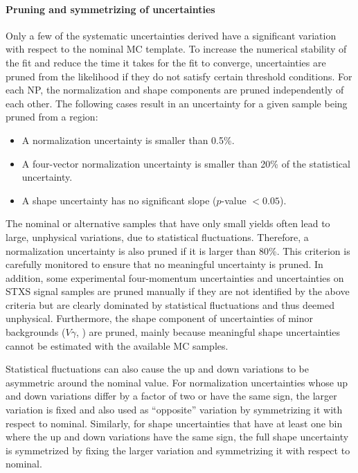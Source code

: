 \paragraph{Pruning and symmetrizing of uncertainties}
Only a few of the systematic uncertainties derived have a significant variation with respect to the nominal MC template. To increase the numerical stability of the fit and reduce the time it takes for the fit to converge, uncertainties are pruned from the likelihood if they do not satisfy certain threshold conditions.
For each NP, the normalization and shape components are pruned independently of each other.
The following cases result in an uncertainty for a given sample being pruned from a region:
\begin{itemize}
    \item A normalization uncertainty is smaller than 0.5\%.
    \item A four-vector normalization uncertainty is smaller than 20\% of the statistical uncertainty. 
    \item A shape uncertainty has no significant slope ($p$-value $< 0.05$).
\end{itemize}
The nominal or alternative samples that have only small yields often lead to large, unphysical variations, due to statistical fluctuations. 
Therefore, a normalization uncertainty is also pruned if it is larger than 80\%. 
This criterion is carefully monitored to ensure that no meaningful uncertainty is pruned.
In addition, some experimental four-momentum uncertainties and uncertainties on STXS signal samples are pruned manually if they are not identified by the above criteria but are clearly dominated by statistical fluctuations and thus deemed unphysical.
Furthermore, the shape component of uncertainties of minor backgrounds ($V\gamma$, \Zgamma) are pruned, mainly because meaningful shape uncertainties cannot be estimated with the available MC samples. 

Statistical fluctuations can also cause the up and down variations to be asymmetric around the nominal value. 
For normalization uncertainties whose up and down variations differ by a factor of two or have the same sign, the larger variation is fixed and also used as ``opposite'' variation by symmetrizing it with respect to nominal.
Similarly, for shape uncertainties that have at least one bin where the up and down variations have the same sign, the full shape uncertainty is symmetrized by fixing the larger variation and symmetrizing it with respect to nominal.

